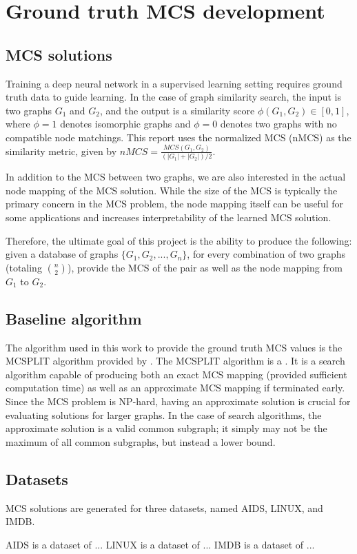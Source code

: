 \section{Ground truth MCS development}
\subsection{MCS solutions}
Training a deep neural network in a supervised learning setting requires ground truth data to guide learning. In the case of graph similarity search, the input is two graphs $G_1$ and $G_2$, and the output is a similarity score $\phi(G_1, G_2) \in [0, 1]$, where $\phi = 1$ denotes isomorphic graphs and $\phi = 0$ denotes two graphs with no compatible node matchings. This report uses the normalized MCS (nMCS) as the similarity metric, given by $nMCS = \frac{MCS(G_1, G_2)}{(|G_1| + |G_2|)/2}$.

In addition to the MCS between two graphs, we are also interested in the actual node mapping of the MCS solution. While the size of the MCS is typically the primary concern in the MCS problem, the node mapping itself can be useful for some applications and increases interpretability of the learned MCS solution.

Therefore, the ultimate goal of this project is the ability to produce the following: given a database of graphs $\{G_1, G_2, ..., G_n\}$, for every combination of two graphs (totaling ${n \choose 2}$), provide the MCS of the pair as well as the node mapping from $G_1$ to $G_2$.

\subsection{Baseline algorithm}
The algorithm used in this work to provide the ground truth MCS values is the MCSPLIT  algorithm provided by  . The MCSPLIT algorithm is a . It is a search algorithm capable of producing both an exact MCS mapping (provided sufficient computation time) as well as an approximate MCS mapping if terminated early. Since the MCS problem is NP-hard, having an approximate solution is crucial for evaluating solutions for larger graphs. In the case of search algorithms, the approximate solution is a valid common subgraph; it simply may not be the maximum of all common subgraphs, but instead a lower bound.

\subsection{Datasets}
MCS solutions are generated for three datasets, named  AIDS, LINUX, and IMDB.

AIDS is a dataset of ...
LINUX is a dataset of ...
IMDB is a dataset of ...
